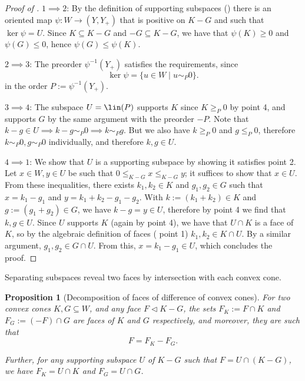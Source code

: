\documentclass{article}
\theoremstyle{plain}
\newtheorem{proposition}[proposition]{Proposition}
\theoremstyle{definition}
\theoremstyle{remark}
\begin{document}
\begin{proof}[\hypertarget{loc:characterization_of_separating_subspaces.proof}{}Proof of ]

$1 \implies 2$: By the definition of supporting subspaces () there is an oriented map $\psi:W \to (Y, Y_+)$ that is positive on
$K-G$ and such that $\ker \psi = U$. Since $K \subseteq K-G$ and $-G \subseteq K-G$, we have that $\psi(K) \ge 0$ and $\psi(G) \le 0$, hence $\psi(G) \leq \psi(K)$.

$2 \implies 3$: The preorder $\psi^{-1}(Y_+)$ satisfies the requirements, since
\begin{equation*}
\ker \psi = \{ u  \in W \mid u \sim_{P} 0\}.
\end{equation*}
in the order $P :=\psi ^{-1}(Y_+)$.

$3 \implies 4$: The subspace $U=\lin(P)$ supports $K$ since $K \geq_{P} 0$ by  point 4, and supports $G$ by the same argument with the preorder $-P$.
Note that $k-g  \in U  \implies k-g \sim_{P} 0  \implies k \sim_{P} g$. But we also have $k \geq_{P} 0$ and $g \leq_{P} 0$, therefore $k \sim_{P} 0,g \sim_{P} 0$ individually, and therefore $k,g \in U$.

$4  \implies 1$: We show that $U$ is a supporting subspace by showing it satisfies  point 2. Let $x  \in W, y  \in U$ be such that $0 \le_{K-G} x \le_{K-G} y$; it suffices to show that $x  \in U$. From these inequalities, there exists $k_1, k_2  \in K$ and $g_1, g_2  \in G$ such that $x = k_1 -g_1$ and $y = k_1 + k_2 - g_1-g_2$.  With $k := (k_1 + k_2)\in K$ and $g := (g_1 + g_2)\in G$, we have $k-g =y \in U$, therefore by point 4 we find that $k,g  \in U$. Since $U$ supports $K$ (again by point 4), we have that $U \cap K$ is a face of $K$, so by the algebraic definition of faces ( point 1) $k_1, k_2 \in K \cap U$. By a similar argument, $g_1, g_2 \in G \cap U$.
From this, $x = k_1 - g_1 \in U$, which concludes the proof.
\end{proof}
Separating subspaces reveal two faces by intersection with each convex cone.
\begin{proposition}[Decomposition of faces of difference of convex cones]
\label{loc:decomposition_of_faces_of_difference_of_convex_cones.statement}
For two convex cones $K, G \subseteq W$, and any face $F \triangleleft K-G$, the
sets
$F_K := F \cap K$ and $F_G := (-F) \cap G$ are faces of $K$ and $G$ respectively,
and moreover, they are such that 
\begin{equation*}
F = F_K-F_G.
\end{equation*}

Further, for any supporting subspace $U$ of $K-G$ such that $F = U \cap (K-G)$,
we have $F_K = U \cap K$ and $F_G = U \cap G$.
\end{proposition}
\end{document}
